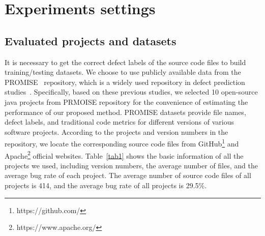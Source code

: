 \documentclass[journal]{IEEEtran}
\begin{document}
\section{Experiments settings}
\subsection{Evaluated projects and datasets}
It is necessary to get the correct defect labels of the source code files to build training/testing datasets. We choose to use publicly available data from the PROMISE~\cite{he2013learning} repository, which is a widely used repository in defect prediction studies~\cite{wang2018deep,fan2019deep,li2017software,he2013learning,jing2014dictionary,chen2020different}. Specifically, based on these previous studies, we selected 10 open-source java projects from PRMOISE repository for the convenience of estimating the performance of our proposed method. PROMISE datasets provide file names, defect labels, and traditional code metrics for different versions of various software projects. According to the projects and version numbers in the repository, we locate the corresponding source code files from GitHub\footnote{https://github.com/} and Apache\footnote{https://www.apache.org/} official websites. Table~\ref{tab1} shows the basic information of all the projects we used, including version numbers, the average number of files, and the average bug rate of each project. The average number of source code files of all projects is 414, and the average bug rate of all projects is 29.5\%.
\end{document}
